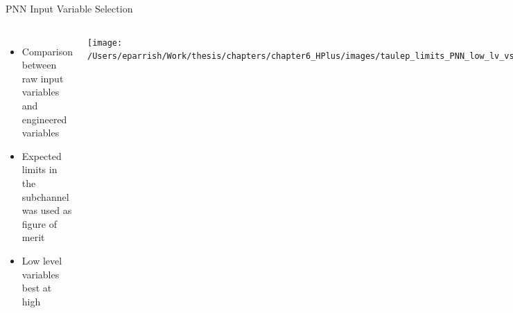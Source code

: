 \documentclass[aspectratio=169,xcolor=table]{beamer}
\begin{document}
\begin{frame}[t]{PNN Input Variable Selection}
\begin{columns}
        \centering
        \begin{table}[!thp]
      \end{table}

    \begin{itemize}
      \item Comparison between raw input variables and engineered variables
      \item Expected limits in the \taulep subchannel was used as figure of merit
      \item Low level variables best at high \mHpm
    \end{itemize}
    \centering
    \texttt{[image: /Users/eparrish/Work/thesis/chapters/chapter6\_HPlus/images/taulep\_limits\_PNN\_low\_lv\_vs\_high\_lv.png]}

    \end{columns}
    \end{frame}
\end{document}
